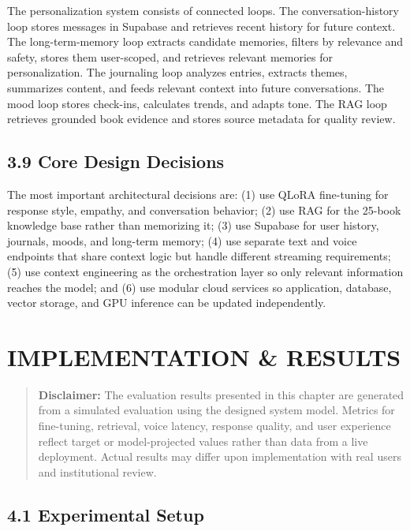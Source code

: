 \documentclass[
  letterpaper,
  12pt,
  a4paper,
  openany]{report}
\begin{document}
The personalization system consists of connected loops. The
conversation-history loop stores messages in Supabase and retrieves
recent history for future context. The long-term-memory loop extracts
candidate memories, filters by relevance and safety, stores them
user-scoped, and retrieves relevant memories for personalization. The
journaling loop analyzes entries, extracts themes, summarizes content,
and feeds relevant context into future conversations. The mood loop
stores check-ins, calculates trends, and adapts tone. The RAG loop
retrieves grounded book evidence and stores source metadata for quality
review.

\section{3.9 Core Design Decisions}\label{core-design-decisions}

The most important architectural decisions are: (1) use QLoRA
fine-tuning for response style, empathy, and conversation behavior; (2)
use RAG for the 25-book knowledge base rather than memorizing it; (3)
use Supabase for user history, journals, moods, and long-term memory;
(4) use separate text and voice endpoints that share context logic but
handle different streaming requirements; (5) use context engineering as
the orchestration layer so only relevant information reaches the model;
and (6) use modular cloud services so application, database, vector
storage, and GPU inference can be updated independently.


\chapter{IMPLEMENTATION \& RESULTS}\label{sec-results-discussions}

\begin{quote}
\textbf{Disclaimer:} The evaluation results presented in this chapter
are generated from a simulated evaluation using the designed system
model. Metrics for fine-tuning, retrieval, voice latency, response
quality, and user experience reflect target or model-projected values
rather than data from a live deployment. Actual results may differ upon
implementation with real users and institutional review.
\end{quote}

\section{4.1 Experimental Setup}\label{experimental-setup}
\end{document}

